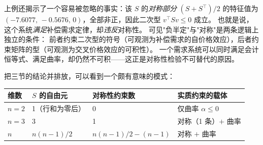 \begin{remark}[两个条件互相独立]
上例还揭示了一个容易被忽略的事实：该 $S$ 的\emph{对称部分} $(S+S^{\top})/2$ 的特征值为
$(-7.6077,\,-0.5676,\,0)$，全部非正，因此二次型 $v^{\top}Sv\le0$ 成立。
也就是说，这个系统\emph{满足}补偿需求定律，却\emph{违反}对称性。
可见"负半定"与"对称"是两条逻辑上独立的条件：
前者约束二次型的符号（可观测为补偿需求的自价格效应），后者约束矩阵的型（可观测为交叉价格效应的可积性）。
一个需求系统可以同时满足会计恒等式、满足曲率，却仍然不可积——这正是对称性检验不可替代的原因。
\end{remark}

\begin{remark}[维数与约束数]
把三节的结论并排放，可以看到一个颇有意味的模式：
\begin{center}
\begin{tabular}{llll}
\toprule
维数 & $S$ 的自由元 & 对称性约束数 & 实质约束的载体\\
\midrule
$n=2$ & 1（行和为零后） & 0 & 仅曲率 $\alpha\le0$\\
$n=3$ & 3 & 1 & 对称（1 条）$+$ 曲率\\
$n$ & $n(n-1)/2$ & $n(n-1)/2-(n-1)$ & 对称 $+$ 曲率\\
\bottomrule
\end{tabular}
\end{center}
\end{remark}
